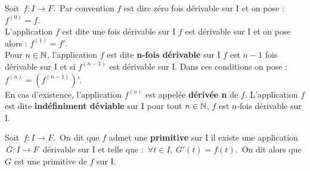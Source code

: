 Soit \(\, f:I\to F.\,\) Par convention $f$ est dire zéro fois dérivable sur I et on pose : $f^{(0)}=f$.\vspace{0.1cm}\\
L'application $f$ est dite une fois dérivable sur I \ssi $f$ est dérivable sur I et on pose alors : $f^{(1)}=f'$.\vspace{0.1cm}\\
Pour \(n\in \mathbb{N}\)\expo{*}, l'application $f$ est dite \textbf{n-fois dérivable} sur I \ssi $f$ est $n-1$ fois dérivable sur I et si $f^{(n-1)}$ est dérivable sur I. Dans ces conditions on pose : \(f^{(n)}=\left(f^{(n-1)}\right)'.\)\vspace{0.1cm}\\
En cas d'existence, l'application $f^{(n)}$ est appelée \textbf{dérivée n} de $f$. L'application $f$ est dite \textbf{indéfiniment déviable} sur I \ssi pour tout \(n\in \mathbb{N}\), $f$ est $n$-fois dérivable sur I. 

\vspace{1.3cm}

Soit \(\,f:I\to F.\,\) On dit que $f$ admet une \textbf{primitive} sur I \ssi il existe une application \(\,G:I\to F\,\) dérivable sur I et telle que : \(\,\forall t \in I,\ G'(t)=f(t).\,\) On dit alors que $G$ est une primitive de $f$ sur I.

\vspace{2cm}
